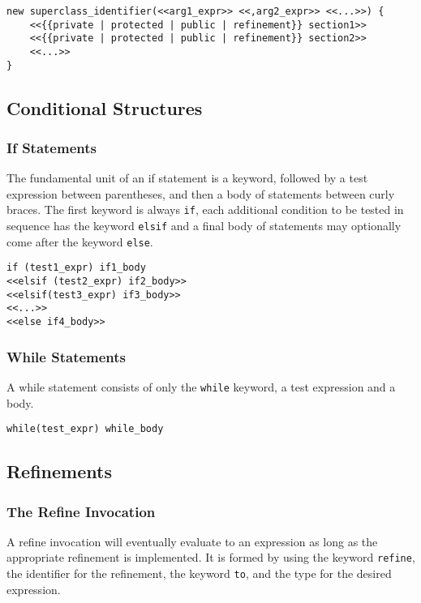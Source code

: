 \begin{lstlisting}
new superclass_identifier(<<arg1_expr>> <<,arg2_expr>> <<...>>) {
    <<{{private | protected | public | refinement}} section1>>
    <<{{private | protected | public | refinement}} section2>>
    <<...>>
}
\end{lstlisting}

\subsection{Conditional Structures}
\subsubsection{If Statements}
The fundamental unit of an if statement is a keyword, followed by a test expression between parentheses, and then a body of statements between curly braces. The first keyword is always \verb!if!, each additional condition to be tested in sequence has the keyword \verb!elsif! and a final body of statements may optionally come after the keyword \verb!else!.

\begin{lstlisting}
if (test1_expr) if1_body
<<elsif (test2_expr) if2_body>>
<<elsif(test3_expr) if3_body>>
<<...>>
<<else if4_body>>
\end{lstlisting}

\subsubsection{While Statements}
A while statement consists of only the \verb!while! keyword, a test expression and a body.

\begin{lstlisting}
while(test_expr) while_body
\end{lstlisting}

\subsection{Refinements}
\subsubsection{The Refine Invocation}
A refine invocation will eventually evaluate to an expression as long as the appropriate refinement is implemented. It is formed by using the keyword \verb!refine!, the identifier for the refinement, the keyword \verb!to!, and the type for the desired expression.

